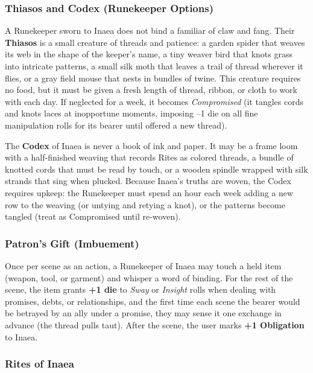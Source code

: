 \subsubsection*{Thiasos and Codex (Runekeeper Options)}

A Runekeeper sworn to Inaea does not bind a familiar of claw and fang. Their \textbf{Thiasos} is a small creature of threads and patience: a garden spider that weaves its web in the shape of the keeper's name, a tiny weaver bird that knots grass into intricate patterns, a small silk moth that leaves a trail of thread wherever it flies, or a gray field mouse that nests in bundles of twine. This creature requires no food, but it must be given a fresh length of thread, ribbon, or cloth to work with each day. If neglected for a week, it becomes \textit{Compromised} (it tangles cords and knots laces at inopportune moments, imposing --1 die on all fine manipulation rolls for its bearer until offered a new thread).

The \textbf{Codex} of Inaea is never a book of ink and paper. It may be a frame loom with a half-finished weaving that records Rites as colored threads, a bundle of knotted cords that must be read by touch, or a wooden spindle wrapped with silk strands that sing when plucked. Because Inaea's truths are woven, the Codex requires upkeep: the Runekeeper must spend an hour each week adding a new row to the weaving (or untying and retying a knot), or the patterns become tangled (treat as Compromised until re-woven).

\subsubsection*{Patron's Gift (Imbuement)}

Once per scene as an action, a Runekeeper of Inaea may touch a held item (weapon, tool, or garment) and whisper a word of binding. For the rest of the scene, the item grants \textbf{+1 die} to \textit{Sway} or \textit{Insight} rolls when dealing with promises, debts, or relationships, and the first time each scene the bearer would be betrayed by an ally under a promise, they may sense it one exchange in advance (the thread pulls taut). After the scene, the user marks \textbf{+1 Obligation} to Inaea.

\subsubsection*{Rites of Inaea}

